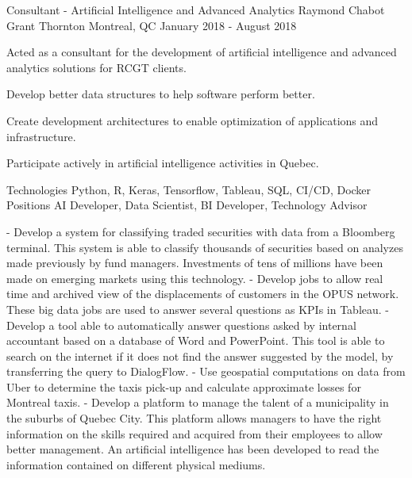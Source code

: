 \begin{cventries}
  \cventry
    {Consultant - Artificial Intelligence and Advanced Analytics}
    {Raymond Chabot Grant Thornton}
    {Montreal, QC}
    {January 2018 - August 2018}
    {
      \begin{cvitems}
        \item {Acted as a consultant for the development of artificial intelligence and advanced analytics solutions for RCGT clients.}
        \item {Develop better data structures to help software perform better.}
		\item {Create development architectures to enable optimization of applications and infrastructure.}
		\item {Participate actively in artificial intelligence activities in Quebec.}
		\vspace{2mm}
        \begin{cvskills}
          \cvskill
          {Technologies}
    	  {Python, R, Keras, Tensorflow, Tableau, SQL, CI/CD, Docker}
    	  \cvskill
          {Positions}
    	  {AI Developer, Data Scientist, BI Developer, Technology Advisor}
        \end{cvskills}
		\begin{cvsubentries}
			{
				- Develop a system for classifying traded securities with data from a Bloomberg terminal. This system is able to classify thousands of securities based on analyzes made previously by fund managers. Investments of tens of millions have been made on emerging markets using this technology.
			}
			{
				- Develop jobs to allow real time and archived view of the displacements of customers in the OPUS network. These big data jobs are used to answer several questions as KPIs in Tableau.
			}
			{
				- Develop a tool able to automatically answer questions asked by internal accountant based on a database of Word and PowerPoint. This tool is able to search on the internet if it does not find the answer suggested by the model, by transferring the query to DialogFlow.
			}
			{
				- Use geospatial computations on data from Uber to determine the taxis pick-up and calculate approximate losses for Montreal taxis.
			}
			{
				- Develop a platform to manage the talent of a municipality in the suburbs of Quebec City. This platform allows managers to have the right information on the skills required and acquired from their employees to allow better management. An artificial intelligence has been developed to read the information contained on different physical mediums.
			}
		\end{cvsubentries}
      \end{cvitems}
    }


\end{cventries}
